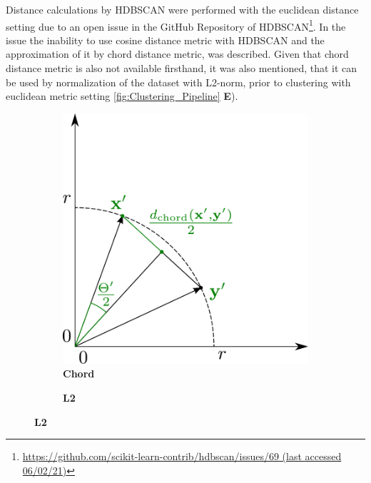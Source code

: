 Distance calculations by \gls{HDBSCAN} were performed with the euclidean distance setting due to an open issue in the GitHub Repository of \gls{HDBSCAN}\footnote{\url{https://github.com/scikit-learn-contrib/hdbscan/issues/69 (last accessed 06/02/21)}}. In the issue the inability to use cosine distance metric with \gls{HDBSCAN} and the approximation of it by chord distance metric, was described. Given that chord distance metric is also not available firsthand, it was also mentioned, that it can be used by normalization of the dataset with L2-norm, prior to clustering with euclidean metric setting \autoref{fig:Clustering_Pipeline} \textsf{\textbf{E}}). 

\begin{figure}[!hbt]
    \centering
    \begin{subfigure}[b]{0.475\textwidth}
        \caption[Chord]{\textbf{Chord}}
        \label{subfig:Chord}
        \includegraphics[width=\textwidth]{Graphics/Chord.pdf}
    \end{subfigure}
    \hfill
    \begin{subfigure}[b]{0.475\textwidth}
        \caption[L2]{\textbf{L2}}
        \label{subfig:L2}            

\end{subfigure}
\end{figure}
